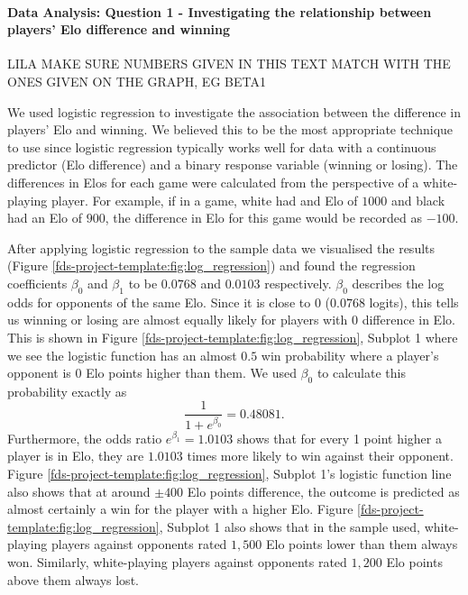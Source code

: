 \documentclass[10pt,a4paper]{article}
\begin{document}
\begin{multicols}{2}


\paragraph{Data Analysis: Question 1 - Investigating the relationship between players' Elo difference and winning}

LILA MAKE SURE NUMBERS GIVEN IN THIS TEXT MATCH WITH THE ONES GIVEN ON THE GRAPH, EG BETA1

We used logistic regression to investigate the association between the difference in players' Elo and winning. We believed this to be the most appropriate technique to use since logistic regression typically works well for data with a continuous predictor (Elo difference) and a binary response variable (winning or losing). The differences in Elos for each game were calculated from the perspective of a white-playing player. For example, if in a game, white had and Elo of $1000$ and black had an Elo of $900$, the difference in Elo for this game would be recorded as $-100$.

After applying logistic regression to the sample data we visualised the results (Figure \ref{fds-project-template:fig:log_regression}) and found the regression coefficients $\beta_{0}$ and $\beta_{1}$ to be $0.0768$ and $0.0103$ respectively. $\beta_{0}$ describes the log odds for opponents of the same Elo. Since it is close to $0$ ($0.0768$ logits), this tells us winning or losing are almost equally likely for players with $0$ difference in Elo. This is shown in Figure \ref{fds-project-template:fig:log_regression}, Subplot 1 where we see the logistic function has an almost $0.5$ win probability where a player's opponent is $0$ Elo points higher than them. We used $\beta_{0}$ to calculate this probability exactly as 
$$\displaystyle\frac{1}{1+e^{\beta_{0}}} = 0.48081.$$
Furthermore, the odds ratio $e^{\beta_{1}} = 1.0103$ shows that for every 1 point higher a player is in Elo, they are $1.0103$ times more likely to win against their opponent. Figure \ref{fds-project-template:fig:log_regression}, Subplot 1's logistic function line also shows that at around $\pm 400$ Elo points difference, the outcome is predicted as almost certainly a win for the player with a higher Elo. Figure \ref{fds-project-template:fig:log_regression}, Subplot 1 also shows that in the sample used, white-playing players against opponents rated $1,500$ Elo points lower than them always won. Similarly, white-playing players against opponents rated $1,200$ Elo points above them always lost. \newline


\end{multicols}
\end{document}
